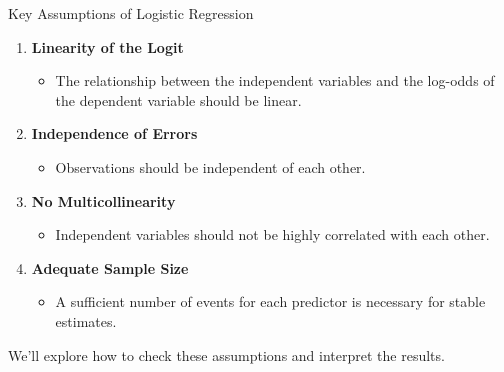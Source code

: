 \documentclass[
  18 pt,
  ignorenonframetext,
  aspectratio=1610,
]{beamer}
\providecommand{\tightlist}{%
  \setlength{\itemsep}{0pt}\setlength{\parskip}{0pt}}\usepackage{longtable,booktabs,array}
\begin{document}
\begin{frame}{Key Assumptions of Logistic Regression}
\protect\hypertarget{key-assumptions-of-logistic-regression}{}
\begin{enumerate}
\tightlist
\item
  \textbf{Linearity of the Logit}

  \begin{itemize}
  \tightlist
  \item
    The relationship between the independent variables and the log-odds
    of the dependent variable should be linear.
  \end{itemize}
\item
  \textbf{Independence of Errors}

  \begin{itemize}
  \tightlist
  \item
    Observations should be independent of each other.
  \end{itemize}
\item
  \textbf{No Multicollinearity}

  \begin{itemize}
  \tightlist
  \item
    Independent variables should not be highly correlated with each
    other.
  \end{itemize}
\item
  \textbf{Adequate Sample Size}

  \begin{itemize}
  \tightlist
  \item
    A sufficient number of events for each predictor is necessary for
    stable estimates.
  \end{itemize}
\end{enumerate}

We'll explore how to check these assumptions and interpret the results.
\end{frame}
\end{document}
